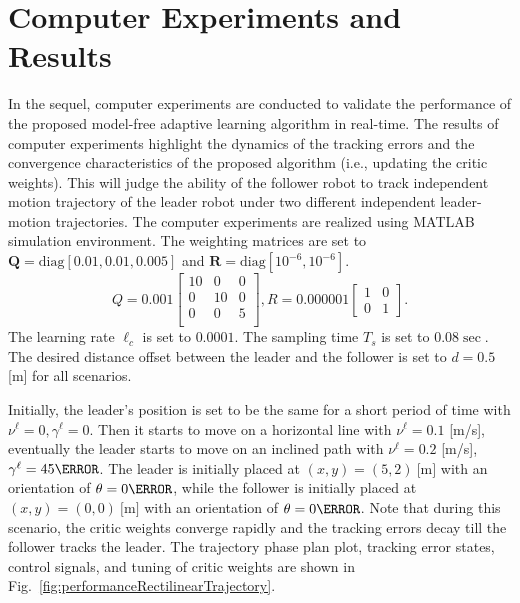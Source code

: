 \documentclass[conference]{IEEEtran}
\begin{document}
    


  

 \section{Computer Experiments and Results}
 \label{sec:resultsExperiments}
 In the sequel, computer experiments  are conducted to validate the performance of the proposed model-free adaptive learning algorithm in real-time. The results of computer experiments highlight the dynamics of the tracking errors and the convergence characteristics of the proposed algorithm (i.e., updating the critic weights). This will judge the ability of the follower robot to track independent motion trajectory of the leader robot under two different independent leader-motion trajectories. The computer experiments are realized using MATLAB simulation environment. The weighting matrices are set to $\mathbf{Q} = \mathrm{diag}[0.01,0.01,0.005]$ and $\mathbf{R} = \mathrm{diag}[10^{-6}, 10^{-6}].$ %
  \[Q=0.001 
  \begin{bmatrix}
  10       & 0   & 0\\
  0       & 10   & 0\\
  0       & 0   &5 \\
  \end{bmatrix},
  R=0.000001
  \begin{bmatrix}
  1       & 0 \\
  0       & 1 
  \end{bmatrix}.\]
 The learning rate $\ell_c$ is set to  $0.0001$. The sampling time $T_s$ is set to $0.08 \sec.$ The desired distance offset between the leader and the follower is set to $ d = 0.5$ [m] for all scenarios.

 
 
 Initially, the leader's position is set to be the same for a short period of time with $\nu^{\ell} = 0 , \gamma^{\ell} = 0$. Then it starts to move on a horizontal line with $\nu^{\ell} = 0.1 $ [m/s], eventually the leader starts to move on an inclined path with $\nu^{\ell} = 0.2$ [m/s], $\gamma^{\ell} = 45\degree$. The leader is initially placed at $(x,y) = (5, 2)~\si{[\meter]}$ with an orientation of $\theta = 0 \degree $, while the follower  is initially placed at $(x,y) = (0, 0)~\si{[\meter]}$ with an orientation of $\theta = 0\degree$. Note that during this scenario, the critic weights converge rapidly and the tracking errors decay till the follower tracks the leader. The trajectory phase plan plot, tracking error states, control signals, and tuning of critic weights are shown in Fig.~\ref{fig:performanceRectilinearTrajectory}. %
 
\end{document}

